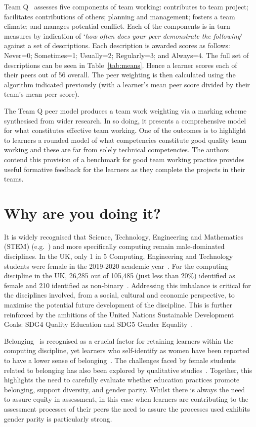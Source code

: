 \documentclass[sigconf, anonymous=true]{acmart}
\begin{document}
Team Q~\cite{Britton2017} assesses five components of team working:
contributes to team project; facilitates contributions of others;
planning and management; fosters a team climate; and manages potential
conflict. Each of the components is in turn measures by indication of
`{\emph{how often does your peer demonstrate the following}}' against
a set of descriptions. Each description is awarded scores as follows:
Never=0; Sometimes=1; Usually=2; Regularly=3; and Always=4. The
full set of descriptions can be seen in Table~\ref{tab:means}. Hence a
learner scores each of their peers out of 56 overall. The peer
weighting is then calculated using the algorithm indicated previously
(with a learner's mean peer score divided by their team's mean peer
score).
  
The Team Q peer model produces a team work weighting via a marking
scheme synthesised from wider research. In so doing, it presents a
comprehensive model for what constitutes effective team working. One
of the outcomes is to highlight to learners a rounded model of what
competencies constitute good quality team working and these are far
from solely technical competencies. The authors contend this provision
of a benchmark for good team working practice provides useful
formative feedback for the learners as they complete the projects in
their teams.

\section{Why are you doing it?}
It is widely recognised that Science, Technology, Engineering and
Mathematics (STEM) (e.g.~\cite{Baird2018}) and more specifically
computing remain male-dominated disciplines. In the UK, only 1 in 5
Computing, Engineering and Technology students were female in the
2019-2020 academic year~\cite{HESA}. For the computing discipline in
the UK, 26,285 out of 105,485 (just less than 20\%) identified as
female and 210 identified as non-binary~\cite{HESA}. Addressing this
imbalance is critical for the disciplines involved, from a social,
cultural and economic perspective, to maximise the potential future
development of the discipline. This is further reinforced by the
ambitions of the United Nations Sustainable Development Goals: SDG4
Quality Education and SDG5 Gender Equality~\cite{UN}.

Belonging~\cite{Veilleux2013} is recognised as a crucial factor for
retaining learners within the computing discipline, yet learners who
self-identify as women have been reported to have a lower sense of
belonging~\cite{Mooney2020}. The challenges faced by female students
related to belonging has also been explored by qualitative
studies~\cite{Winter2021}. Together, this highlights the need to
carefully evaluate whether education practices promote belonging,
support diversity, and gender parity. Whilst there is always the need
to assure equity in assessment, in this case when learners are
contributing to the assessment processes of their peers the need to
assure the processes used exhibits gender parity is particularly
strong.
\end{document}
